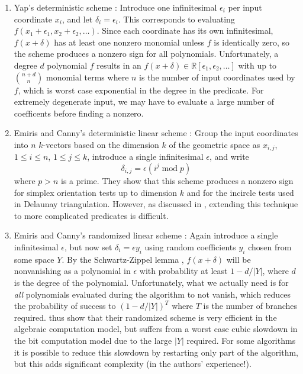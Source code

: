 \documentclass[11pt]{article}
\newcommand{\R}{\mathbb{R}}
\begin{document}
\begin{enumerate}
\item Yap's deterministic scheme \cite{yap1990symbolic}: Introduce one infinitesimal $\epsilon_i$ per input coordinate $x_i$, and let $\delta_i = \epsilon_i$.  This
corresponds to evaluating $f(x_1+\epsilon_1, x_2+\epsilon_2, \ldots)$.  Since each coordinate has its own infinitesimal, $f(x+\delta)$ has at least
one nonzero monomial unless $f$ is identically zero, so the scheme produces a nonzero sign for all polynomials.  Unfortunately, a degree $d$ polynomial
$f$ results in an $f(x+\delta) \in \R[\epsilon_1,\epsilon_2, \ldots]$ with up to $\binom{n + d}{n}$ monomial terms where $n$ is the number of input
coordinates used by $f$, which is worst case exponential in the degree in the predicate.  For extremely degenerate input, we may have to evaluate a large
number of coefficents before finding a nonzero.

\item Emiris and Canny's deterministic linear scheme \cite{emiris1992efficient}: Group the input coordinates into $n$ $k$-vectors based on the dimension
$k$ of the geometric space as $x_{i,j}$, $1 \le i \le n$, $1 \le j \le k$, introduce a single infinitesimal $\epsilon$, and write
$$\delta_{i,j} = \epsilon (i^j \operatorname{mod} p)$$
where $p > n$ is a prime.  They show that this scheme produces a nonzero sign for simplex orientation tests up to dimension $k$ and for
the incircle tests used in Delaunay triangulation.  However, as discussed in \cite{seidel1998nature}, extending this technique to more complicated predicates
is difficult.

\item Emiris and Canny's randomized linear scheme \cite{emiris1995general}: Again introduce a single infinitesimal $\epsilon$, but now set
$\delta_i = \epsilon y_i$ using random coefficients $y_i$ chosen from some space $Y$.  By the Schwartz-Zippel lemma \cite{schwartz1980fast}, $f(x+\delta)$
will be nonvanishing as a polynomial in $\epsilon$ with probability at least $1 - d/|Y|$, where $d$ is the degree of the polynomial.  Unfortunately, what we
actually need is for \emph{all} polynomials evaluated during the algorithm to not vanish, which reduces the probability of success to
$(1 - d/|Y|)^T$ where $T$ is the number of branches required.  \cite{emiris1995general} thus show that their randomized scheme is very efficient in the
algebraic computation model, but suffers from a worst case cubic slowdown in the bit computation model due to the large $|Y|$ required.  For some algorithms
it is possible to reduce this slowdown by restarting only part of the algorithm, but this adds significant complexity (in the authors' experience!).
\end{enumerate}
\end{document}
